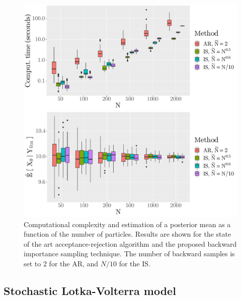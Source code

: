 \documentclass{article}
\begin{document}
\begin{figure}[h]
\begin{center}
\includegraphics[scale = .4]{comparing_IS_AR_N_vary.pdf}
\end{center}
\caption{Computational complexity and estimation of a posterior mean as a function of the number of particles. Results are shown for the state of the art acceptance-rejection algorithm and the proposed backward  importance sampling technique. The number of backward samples is set to 2 for the AR, and $N/10$ for the IS.}
\label{fig:sine:timeandbias:N:vary}
\end{figure}

\subsection{Stochastic Lotka-Volterra model}
\label{sec:simu:LV}
\end{document}
